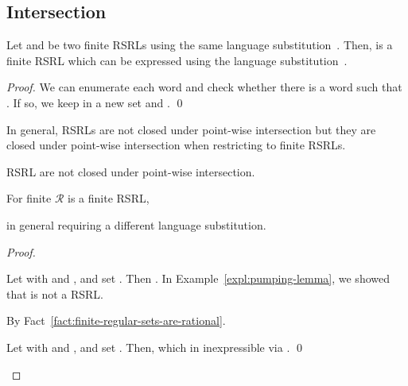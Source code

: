 \documentclass[envcountsame]{llncs}
\newcommand{\rationalset}{\ensuremath{\mathcal{R}}\xspace}
\newcommand{\RegularlyGeneratedLanguageSetAbbrev}{RSRL\xspace}
\newcommand{\RegularlyGeneratedLanguageSetsAbbrev}{RSRLs\xspace}
\newcommand{\RegularlyGeneratedLanguageSetsStartAbbrev}{RSRL\xspace}
\begin{document}
\subsection{Intersection}
\label{sec:intersection}


\begin{proposition}
	\label{prop:closure:intersection}
Let  and
       be two finite \RegularlyGeneratedLanguageSetsAbbrev using the same
      language substitution~.  Then,  is a finite \RegularlyGeneratedLanguageSetAbbrev which can be expressed
      using the language substitution~.
\end{proposition}

\begin{proof}
We can enumerate each word  and check whether there is a word  such that .
	If so, we keep  in a new set  and .
	\qed
\end{proof}


In general, \RegularlyGeneratedLanguageSetsAbbrev are not closed under point-wise intersection
but they are closed under point-wise intersection when restricting to
finite \RegularlyGeneratedLanguageSetsAbbrev.


\begin{proposition}
  \label{prop:closure:pw-intersection}
  \begin{inparaenum}
  \item\label{prop:closure:pw-intersection:a} \RegularlyGeneratedLanguageSetsStartAbbrev are not
    closed under point-wise intersection.
  \item\label{prop:closure:pw-intersection:b} For finite
    \rationalset  is a finite \RegularlyGeneratedLanguageSetAbbrev,
  \item\label{prop:closure:pw-intersection:c} in general requiring a
    different language substitution.
  \end{inparaenum}
\end{proposition}

\begin{proof}
  \begin{inparaenum}[\bfseries(1)]
  \item Let  with 
    and , and set .  
Then .  
In Example~\ref{expl:pumping-lemma}, we showed that
     is not a \RegularlyGeneratedLanguageSetAbbrev.
  \item By Fact~\ref{fact:finite-regular-sets-are-rational}.
  \item Let  with  and
    , and set .
Then,  which in
    inexpressible via .  \qed
  \end{inparaenum}
\end{proof}
\end{document}
